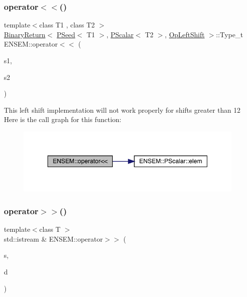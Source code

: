 \subsubsection{\texorpdfstring{operator$<$$<$()}{operator<<()}\hspace{0.1cm}{\footnotesize\ttfamily [4/4]}}
{\footnotesize\ttfamily template$<$class T1 , class T2 $>$ \\
\mbox{\hyperlink{structENSEM_1_1BinaryReturn}{Binary\+Return}}$<$ \mbox{\hyperlink{classENSEM_1_1PSeed}{P\+Seed}}$<$ T1 $>$, \mbox{\hyperlink{classENSEM_1_1PScalar}{P\+Scalar}}$<$ T2 $>$, \mbox{\hyperlink{structENSEM_1_1OpLeftShift}{Op\+Left\+Shift}} $>$\+::Type\+\_\+t E\+N\+S\+E\+M\+::operator$<$$<$ (\begin{DoxyParamCaption}\item[{const \mbox{\hyperlink{classENSEM_1_1PSeed}{P\+Seed}}$<$ T1 $>$ \&}]{s1,  }\item[{const \mbox{\hyperlink{classENSEM_1_1PScalar}{P\+Scalar}}$<$ T2 $>$ \&}]{s2 }\end{DoxyParamCaption})\hspace{0.3cm}{\ttfamily [inline]}}

This left shift implementation will not work properly for shifts greater than 12 Here is the call graph for this function\+:\nopagebreak
\begin{figure}[H]
\begin{center}
\leavevmode
\includegraphics[width=341pt]{df/d3c/group__primseed_ga2c9462b410a1897e81847c2ca630c0fd_cgraph}
\end{center}
\end{figure}
\mbox{\label{group__primseed_gaab9d3da69048030afda4583bcd687578}} 
\subsubsection{\texorpdfstring{operator$>$$>$()}{operator>>()}\hspace{0.1cm}{\footnotesize\ttfamily [1/2]}}
{\footnotesize\ttfamily template$<$class T $>$ \\
std\+::istream \& E\+N\+S\+E\+M\+::operator$>$$>$ (\begin{DoxyParamCaption}\item[{std\+::istream \&}]{s,  }\item[{\mbox{\hyperlink{classENSEM_1_1PSeed}{P\+Seed}}$<$ T $>$ \&}]{d }\end{DoxyParamCaption})\hspace{0.3cm}{\ttfamily [inline]}}



